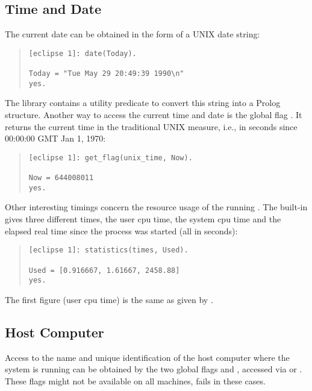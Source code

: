 \subsection{Time and Date}
The current date can be obtained in the form of a UNIX date string:
\begin{quote}
\begin{verbatim}
[eclipse 1]: date(Today).

Today = "Tue May 29 20:49:39 1990\n"
yes.
\end{verbatim}
\end{quote}
The library  contains a utility predicate to convert
this string into a Prolog structure.
Another way to access the current time and date is the global flag
. It returns the current time in the traditional UNIX
measure, i.e., in seconds since 00:00:00 GMT Jan 1, 1970:
\begin{quote}
\begin{verbatim}
[eclipse 1]: get_flag(unix_time, Now).

Now = 644008011
yes.
\end{verbatim}
\end{quote}
Other interesting timings concern the resource usage of the running {\eclipse}.
The  built-in gives
three different times, the user
cpu time, the system cpu time and the elapsed real time since
the process was started (all in seconds):
\begin{quote}
\begin{verbatim}
[eclipse 1]: statistics(times, Used).

Used = [0.916667, 1.61667, 2458.88]
yes.
\end{verbatim}\end{quote}
The first figure (user cpu time) is the same as given by
.

\subsection{Host Computer}
Access to the name and unique identification of the host computer where
the system is running can be obtained by the two global flags
 and , accessed via
 or
. These flags might not be
available on all machines,
 fails in these cases.

